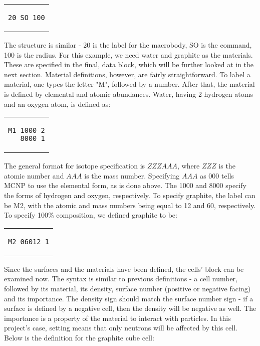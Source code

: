 \begin{center}
\begin{tabular}{c}
\begin{lstlisting}
20 SO 100
\end{lstlisting}
\end{tabular}
\end{center}
The structure is similar - 20 is the label for the macrobody, SO is the command, 100 is the radius. For this example, we need water and graphite as the materials. These are specified in the final, data block, which will be further looked at in the next section. Material definitions, however, are fairly straightforward. To label a material, one types the letter "M", followed by a number. After that, the material is defined by elemental and atomic abundances. Water, having 2 hydrogen atoms and an oxygen atom, is defined as:
\begin{center}
\begin{tabular}{c}
\begin{lstlisting}
M1 1000 2
   8000 1
\end{lstlisting}
\end{tabular}
\end{center}
The general format for isotope specification is $ZZZAAA$, where $ZZZ$ is the atomic number and $AAA$ is the mass number. Specifying $AAA$ as 000 tells MCNP to use the elemental form, as is done above. The 1000 and 8000 specify the forms of hydrogen and oxygen, respectively. To specify graphite, the label can be M2, with the atomic and mass numbers being equal to 12 and 60, respectively. To specify 100\% composition, we defined graphite to be:
\begin{center}
\begin{tabular}{c}
\begin{lstlisting}
M2 06012 1
\end{lstlisting}
\end{tabular}
\end{center}
Since the surfaces and the materials have been defined, the cells' block can be examined now. The syntax is similar to previous definitions - a cell number, followed by its material, its density, surface number (positive or negative facing) and its importance. The density sign should match the surface number sign - if a surface is defined by a negative cell, then the density will be negative as well. The importance is a property of the material to interact with particles. In this project's case, setting  means that only neutrons will be affected by this cell. Below is the definition for the graphite cube cell:
